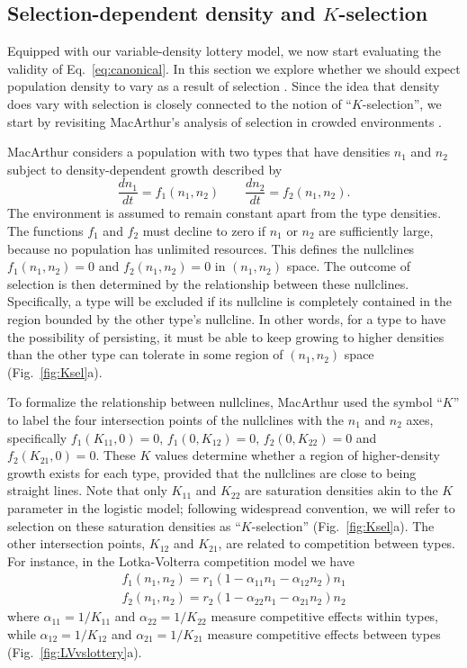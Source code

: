 \documentclass[11pt]{article}
\begin{document}
\subsection*{Selection-dependent density and $K$-selection}

Equipped with our variable-density lottery model, we now start evaluating the validity of Eq.~\eqref{eq:canonical}. In this section we explore whether we should expect population density to vary as a result of selection \citep{prout_1980}. Since the idea that density does vary with selection is closely connected to the notion of ``$K$-selection'', we start by revisiting MacArthur's analysis of selection in crowded environments \citep{macarthur_1967}. 

MacArthur considers a population with two types that have densities $n_1$ and $n_2$ subject to density-dependent growth described by
\begin{equation}
\frac{d n_1}{d t}=f_1(n_1,n_2)\qquad\frac{d n_2}{d t}=f_2(n_1,n_2). \label{eq:macgeneral}
\end{equation}
The environment is assumed to remain constant apart from the type densities. The functions $f_1$ and $f_2$ must decline to zero if $n_1$ or $n_2$ are sufficiently large, because no population has unlimited resources. This defines the nullclines $f_1(n_1,n_2)=0$ and $f_2(n_1,n_2)=0$ in $(n_1,n_2)$ space. The outcome of selection is then determined by the relationship between these nullclines. Specifically, a type will be excluded if its nullcline is completely contained in the region bounded by the other type's nullcline. In other words, for a type to have the possibility of persisting, it must be able to keep growing to higher densities than the other type can tolerate in some region of $(n_1,n_2)$ space (Fig.~\ref{fig:Ksel}a).

To formalize the relationship between nullclines, MacArthur used the symbol ``$K$'' to label the four intersection points of the nullclines with the $n_1$ and $n_2$ axes, specifically $f_1(K_{11},0)=0$, $f_1(0,K_{12})=0$, $f_2(0,K_{22})=0$ and $f_2(K_{21},0)=0$. These $K$ values determine whether a region of higher-density growth exists for each type, provided that the nullclines are close to being straight lines. Note that only $K_{11}$ and $K_{22}$ are saturation densities akin to the $K$ parameter in the logistic model; following widespread convention, we will refer to selection on these saturation densities as ``$K$-selection'' (Fig.~\ref{fig:Ksel}a). The other intersection points, $K_{12}$ and $K_{21}$, are related to competition between types. For instance, in the Lotka-Volterra competition model we have
\begin{align}
f_1(n_1,n_2) = r_1(1-\alpha_{11}n_1-\alpha_{12}n_2)n_1\nonumber\\
f_2(n_1,n_2) = r_2(1-\alpha_{22}n_1-\alpha_{21}n_2)n_2\label{eq:LV}
\end{align}
where $\alpha_{11}=1/K_{11}$ and $\alpha_{22}=1/K_{22}$ measure competitive effects within types, while $\alpha_{12}=1/K_{12}$ and $\alpha_{21}=1/K_{21}$ measure competitive effects between types (Fig.~\ref{fig:LVvslottery}a). 
\end{document}
